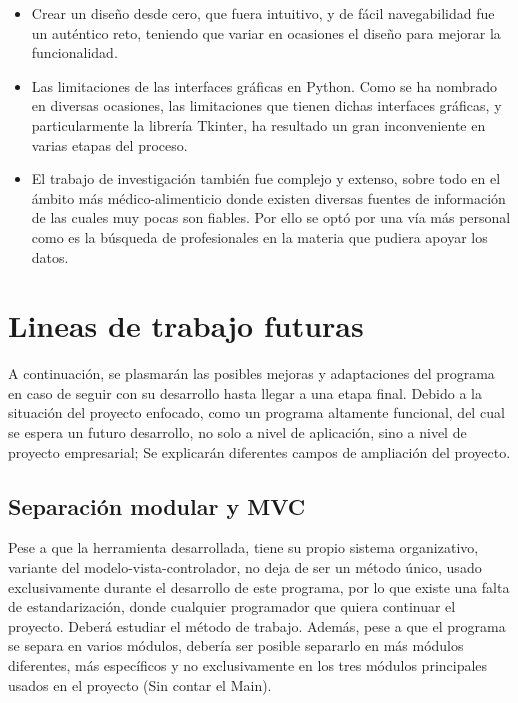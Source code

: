 \begin{itemize}
\item	Crear un diseño desde cero, que fuera intuitivo, y de fácil navegabilidad fue un auténtico reto, teniendo que variar en ocasiones el diseño para mejorar la funcionalidad.
\item	Las limitaciones de las interfaces gráficas en Python. Como se ha nombrado en diversas ocasiones, las limitaciones que tienen dichas interfaces gráficas, y particularmente la librería Tkinter, ha resultado un gran inconveniente en varias etapas del proceso.
\item	El trabajo de investigación también fue complejo y extenso, sobre todo en el ámbito más médico-alimenticio donde existen diversas fuentes de información de las cuales muy pocas son fiables. Por ello se optó por una vía más personal como es la búsqueda de profesionales en la materia que pudiera apoyar los datos.
\end{itemize}

\section{Lineas de trabajo futuras}
A continuación, se plasmarán las posibles mejoras y adaptaciones del programa en caso de seguir con su desarrollo hasta llegar a una etapa final. Debido a la situación del proyecto enfocado, como un programa altamente funcional, del cual se espera un futuro desarrollo, no solo a nivel de aplicación, sino a nivel de proyecto empresarial; Se explicarán diferentes campos de ampliación del proyecto.
\subsection{Separación modular y MVC}
Pese a que la herramienta desarrollada, tiene su propio sistema organizativo, variante del modelo-vista-controlador, no deja de ser un método único, usado exclusivamente durante el desarrollo de este programa, por lo que existe una falta de estandarización, donde cualquier programador que quiera continuar el proyecto. Deberá estudiar el método de trabajo. Además, pese a que el programa se separa en varios módulos, debería ser posible separarlo en más módulos diferentes, más específicos y no exclusivamente en los tres módulos principales usados en el proyecto (Sin contar el Main).
